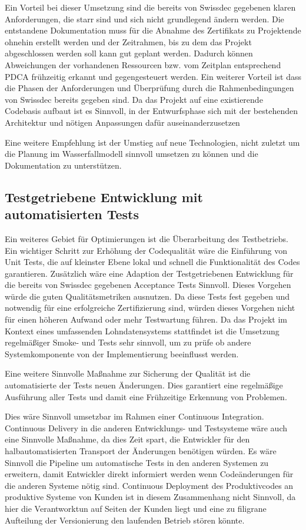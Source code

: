 Ein Vorteil bei dieser Umsetzung sind die bereits von Swissdec gegebenen klaren Anforderungen, die starr sind und sich nicht grundlegend ändern werden. Die entstandene Dokumentation muss für die Abnahme des Zertifikats zu Projektende ohnehin erstellt werden und der Zeitrahmen, bis zu dem das Projekt abgeschlossen werden soll kann gut geplant werden. Dadurch können Abweichungen der vorhandenen Ressourcen bzw. vom Zeitplan entsprechend PDCA frühzeitig erkannt und gegengesteuert werden.
Ein weiterer Vorteil ist dass die Phasen der Anforderungen und Überprüfung durch die Rahmenbedingungen von Swissdec bereits gegeben sind.
Da das Projekt auf eine existierende Codebasis aufbaut ist es Sinnvoll, in der Entwurfsphase sich mit der bestehenden Architektur und nötigen Anpassungen dafür auseinanderzusetzen

Eine weitere Empfehlung ist der Umstieg auf neue Technologien, nicht zuletzt um die Planung im Wasserfallmodell sinnvoll umsetzen zu können und die Dokumentation zu unterstützen.


\subsection{Testgetriebene Entwicklung mit automatisierten Tests}

Ein weiteres Gebiet für Optimierungen ist die Überarbeitung des Testbetriebs.
Ein wichtiger Schritt zur Erhöhung der Codequalität wäre die Einführung von Unit Tests, die auf kleinster Ebene lokal und schnell die Funktionalität des Codes garantieren.
Zusätzlich wäre eine Adaption der Testgetriebenen Entwicklung für die bereits von Swissdec gegebenen Acceptance Tests Sinnvoll. Dieses Vorgehen würde die guten Qualitätsmetriken ausnutzen. Da diese Tests fest gegeben und notwendig für eine erfolgreiche Zertifizierung sind, würden dieses Vorgehen nicht für einen höheren Aufwand oder mehr Testwartung führen.
Da das Projekt im Kontext eines umfassenden Lohndatensystems stattfindet ist die Umsetzung regelmäßiger Smoke- und Tests sehr sinnvoll, um zu prüfe ob andere Systemkomponente von der Implementierung beeinflusst werden.

Eine weitere Sinnvolle Maßnahme zur Sicherung der Qualität ist die automatisierte der Tests neuen Änderungen. Dies garantiert eine regelmäßige Ausführung aller Tests und damit eine Frühzeitige Erkennung von Problemen.

Dies wäre Sinnvoll umsetzbar im Rahmen einer Continuous Integration. Continuous Delivery in die anderen Entwicklungs- und Testsysteme wäre auch eine Sinnvolle Maßnahme, da dies Zeit spart, die Entwickler für den halbautomatisierten Transport der Änderungen benötigen würden.
Es wäre Sinnvoll die Pipeline um automatische Tests in den anderen Systemen zu erweitern, damit Entwickler direkt informiert werden wenn Codeänderungen für die anderen Systeme nötig sind.
Continuous Deployment des Produktivcodes an produktive Systeme von Kunden ist in diesem Zusammenhang nicht Sinnvoll, da hier die Verantworktun auf Seiten der Kunden liegt und eine zu filigrane Aufteilung der Versionierung den laufenden Betrieb stören könnte.


